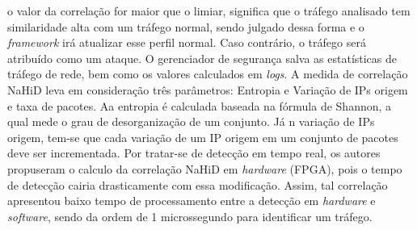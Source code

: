 o  valor da correlação for maior que o limiar, significa que o tráfego analisado tem similaridade alta com um tráfego normal, sendo julgado dessa forma e o \textit{framework} irá atualizar esse perfil normal. Caso contrário, o tráfego será atribuído como um ataque. O gerenciador de segurança  salva as estatísticas de tráfego de rede, bem como os valores calculados em \textit{logs}. A medida de correlação NaHiD leva em consideração três parâmetros: Entropia e Variação de IPs origem e taxa de pacotes. Aa entropia é calculada baseada na fórmula de Shannon, a qual mede o grau de desorganização de um conjunto. Já n variação de IPs origem, tem-se que cada variação de um IP origem em um conjunto de pacotes deve ser incrementada. Por tratar-se de detecção em tempo real, os autores propuseram o calculo da correlação NaHiD em \textit{hardware} (FPGA), pois o tempo de detecção cairia drasticamente com essa modificação. Assim, tal correlação apresentou baixo tempo de processamento entre a detecção em \textit{hardware} e \textit{software}, sendo da ordem de 1 microssegundo para identificar um tráfego.  
 


   


